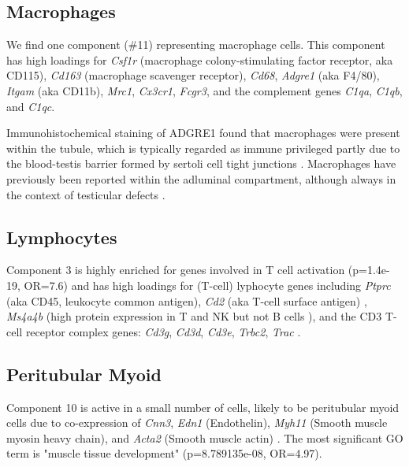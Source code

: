 

\subsection{Macrophages}
We find one component (\#11) representing macrophage cells. This component has high loadings for \textit{Csf1r} (macrophage colony-stimulating factor receptor, aka CD115), \textit{Cd163} (macrophage scavenger receptor), \textit{Cd68}, \textit{Adgre1} (aka F4/80), \textit{Itgam} (aka CD11b), \textit{Mrc1}, \textit{Cx3cr1}, \textit{Fcgr3}, and the complement genes \textit{C1qa}, \textit{C1qb}, and \textit{C1qc}. \parencite{Mossadegh-Keller2017Developmental, Fabriek2005macrophage, Sasmono2012Generation}

Immunohistochemical staining of ADGRE1 found that macrophages were present within the tubule, which is typically regarded as immune privileged partly due to the blood-testis barrier formed by sertoli cell tight junctions \parencite{Fijak2006testis}. Macrophages have previously been reported within the adluminal compartment, although always in the context of testicular defects \parencite{Frungieri2002Number, Goluza2014Macrophages}.


\subsection{Lymphocytes}
Component 3 is highly enriched for genes involved in T cell activation (p=1.4e-19, OR=7.6) and has high loadings for (T-cell) lyphocyte genes including \textit{Ptprc} (aka CD45, leukocyte common antigen), \textit{Cd2} (aka T-cell surface antigen) \parencite{Murray2011Protective, Murphy2012Janeway}, \textit{Ms4a4b} (high protein expression in T and NK but not B cells \cite{Xu2010MS4a4B}), and the CD3 T-cell receptor complex genes: \textit{Cd3g}, \textit{Cd3d}, \textit{Cd3e}, \textit{Trbc2}, \textit{Trac} \parencite{Call2002Organizing}.


\subsection{Peritubular Myoid}

Component 10 is active in a small number of cells, likely to be peritubular myoid cells due to co-expression of \textit{Cnn3}, \textit{Edn1} (Endothelin), \textit{Myh11} (Smooth muscle myosin heavy chain), and \textit{Acta2} (Smooth muscle actin) \parencite{Mayerhofer2013Human}. The most significant GO term is "muscle tissue development" (p=8.789135e-08, OR=4.97).





